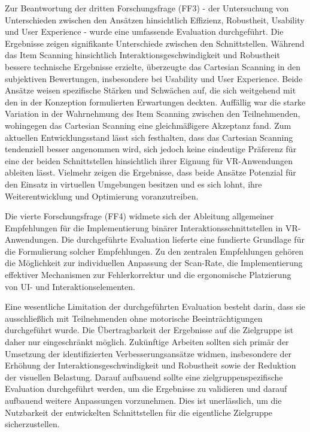 Zur Beantwortung der dritten Forschungsfrage (FF3) - der Untersuchung von Unterschieden zwischen den Ansätzen hinsichtlich Effizienz, Robustheit, Usability und User Experience - wurde eine umfassende Evaluation durchgeführt. Die Ergebnisse zeigen signifikante Unterschiede zwischen den Schnittstellen. Während das Item Scanning hinsichtlich Interaktionsgeschwindigkeit und Robustheit bessere technische Ergebnisse erzielte, überzeugte das Cartesian Scanning in den subjektiven Bewertungen, insbesondere bei Usability und User Experience. Beide Ansätze weisen spezifische Stärken und Schwächen auf, die sich weitgehend mit den in der Konzeption formulierten Erwartungen deckten. Auffällig war die starke Variation in der Wahrnehmung des Item Scanning zwischen den Teilnehmenden, wohingegen das Cartesian Scanning eine gleichmäßigere Akzeptanz fand. Zum aktuellen Entwicklungsstand lässt sich festhalten, dass das Cartesian Scanning tendenziell besser angenommen wird, sich jedoch keine eindeutige Präferenz für eine der beiden Schnittstellen hinsichtlich ihrer Eignung für VR-Anwendungen ableiten lässt. Vielmehr zeigen die Ergebnisse, dass beide Ansätze Potenzial für den Einsatz in virtuellen Umgebungen besitzen und es sich lohnt, ihre Weiterentwicklung und Optimierung voranzutreiben.

Die vierte Forschungsfrage (FF4) widmete sich der Ableitung allgemeiner Empfehlungen für die Implementierung binärer Interaktionsschnittstellen in VR-Anwendungen. Die durchgeführte Evaluation lieferte eine fundierte Grundlage für die Formulierung solcher Empfehlungen. Zu den zentralen Empfehlungen gehören die Möglichkeit zur individuellen Anpassung der Scan-Rate, die Implementierung effektiver Mechanismen zur Fehlerkorrektur und die ergonomische Platzierung von UI- und Interaktionselementen.

Eine wesentliche Limitation der durchgeführten Evaluation besteht darin, dass sie ausschließlich mit Teilnehmenden ohne motorische Beeinträchtigungen durchgeführt wurde. Die Übertragbarkeit der Ergebnisse auf die Zielgruppe ist daher nur eingeschränkt möglich. Zukünftige Arbeiten sollten sich primär der Umsetzung der identifizierten Verbesserungsansätze widmen, insbesondere der Erhöhung der Interaktionsgeschwindigkeit und Robustheit sowie der Reduktion der visuellen Belastung. Darauf aufbauend sollte eine zielgruppenspezifische Evaluation durchgeführt werden, um die Ergebnisse zu validieren und darauf aufbauend weitere Anpassungen vorzunehmen. Dies ist unerlässlich, um die Nutzbarkeit der entwickelten Schnittstellen für die eigentliche Zielgruppe sicherzustellen.

